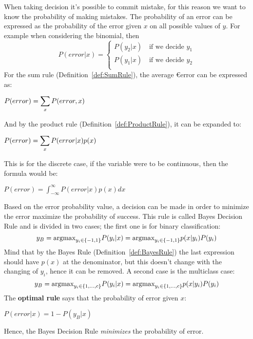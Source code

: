 When taking decision it's possible to commit mistake, for this reason we want to know the probability of making mistakes. \newline
The probability of an error can be expressed as the probability of the error given $x$ on all possible values of $y$. For example when considering the binomial, then
\[P(error\vert x)=
\begin{cases}
	P(y_2\vert x)\quad \text{if we decide }y_1\\
	P(y_1\vert x)\quad \text{if we decide }y_2\\
\end{cases}
\]
For the sum rule (Definition~\ref{def:SumRule}), the average €error can be expressed as:
\begin{center}
	$\displaystyle P(error)=\displaystyle\sum_xP(error, x)$
\end{center}
And by the product rule (Definition~\ref{def:ProductRule}), it can be expanded to:
\begin{center}
	$\displaystyle P(error)=\displaystyle\sum_xP(error\vert x)p(x)$
\end{center}
This is for the discrete case, if the variable were to be continuous, then the formula would be:
\begin{center}
	$\displaystyle P(error)=\int_{-\infty}^\infty P(error\vert x)p(x)dx$
\end{center}
Based on the error probability value, a decision can be made in order to minimize the error maximize the probability of success. This rule is called Bayes Decision Rule and is divided in two cases; the first one is for binary classification:
\begin{equation}
	y_B=\text{argmax}_{y_i\in\{-1,1\}}P(y_i\vert x)=\text{argmax}_{y_i\in\{-1, 1\}}p(x\vert y_i)P(y_i)
	\label{eq:BayesianDecisionRuleBinary}
\end{equation} 
Mind that by the Bayes Rule (Definition~\ref{def:BayesRule}) the last expression should have $p(x)$ at the denominator, but this doesn't change with the changing of $y_i$, hence it can be removed. \newline
A second case is the multiclass case:
\begin{equation}
	y_B=\text{argmax}_{y_i\in\{1, \hdots, c\}}P(y_i\vert x)=\text{argmax}_{y_i\in\{1, \hdots, c\}}p(x\vert y_i)P(y_i)
	\label{eq:BayesianDecisionRuleMulticlass}
\end{equation}
The \textbf{optimal rule} says that the probability of error given $x$:
\begin{center}
	$\displaystyle P(error\vert x)=1-P(y_B\vert x)$
\end{center}
Hence, the Bayes Decision Rule \textit{minimizes} the probability of error.\newline
%
%
%
